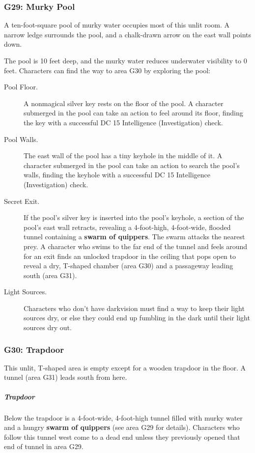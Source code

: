 \documentclass[10pt,a4paper,twoside,bg=print,twocolumn,openany,nodeprecatedcode]{dndbook}
\begin{document}
\subsubsection{G29: Murky Pool}
\begin{DndReadAloud}{}
A ten-foot-square pool of murky water occupies most of this unlit room. A narrow ledge surrounds the pool, and a chalk-drawn arrow on the east wall points down.

\end{DndReadAloud}

The pool is 10 feet deep, and the murky water reduces underwater visibility to 0 feet. Characters can find the way to area G30 by exploring the pool:


\begin{description}
\item[Pool Floor.]
A nonmagical silver key rests on the floor of the pool. A character submerged in the pool can take an action to feel around its floor, finding the key with a successful DC 15 Intelligence (Investigation) check.
\item[Pool Walls.]
The east wall of the pool has a tiny keyhole in the middle of it. A character submerged in the pool can take an action to search the pool's walls, finding the keyhole with a successful DC 15 Intelligence (Investigation) check.
\item[Secret Exit.]
If the pool's silver key is inserted into the pool's keyhole, a section of the pool's east wall retracts, revealing a 4-foot-high, 4-foot-wide, flooded tunnel containing a \textbf{swarm of quippers}. The swarm attacks the nearest prey. A character who swims to the far end of the tunnel and feels around for an exit finds an unlocked trapdoor in the ceiling that pops open to reveal a dry, T-shaped chamber (area G30) and a passageway leading south (area G31).
\item[Light Sources.]
Characters who don't have darkvision must find a way to keep their light sources dry, or else they could end up fumbling in the dark until their light sources dry out.
\end{description}

\subsubsection{G30: Trapdoor}
This unlit, T-shaped area is empty except for a wooden trapdoor in the floor. A tunnel (area G31) leads south from here.

\subparagraph{Trapdoor}
Below the trapdoor is a 4-foot-wide, 4-foot-high tunnel filled with murky water and a hungry \textbf{swarm of quippers} (see area G29 for details). Characters who follow this tunnel west come to a dead end unless they previously opened that end of tunnel in area G29.
\end{document}
